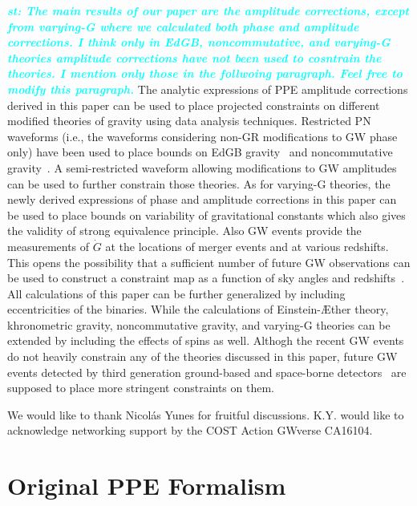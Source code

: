 \documentclass[prd,twocolumn,nofootinbib]{revtex4-1}
\newcommand{\st}[1]{\textcolor{cyan}{\it{\textbf{st: #1}}} }
\begin{document}
\st{The main results of our paper are the amplitude corrections, except from varying-G where we calculated both phase and amplitude corrections. I think only in EdGB, noncommutative, and varying-G theories amplitude corrections have not been used to cosntrain the theories. I mention only those in the follwoing paragraph. Feel free to modify this paragraph.}
The analytic expressions of PPE amplitude corrections derived in this paper can be used to place projected constraints on different modified theories of gravity using data analysis techniques. Restricted PN waveforms (i.e., the waveforms considering non-GR modifications to GW phase only) have been used to place bounds on EdGB gravity~\cite{Yunes:2016jcc} and noncommutative gravity~\cite{Kobakhidze:2016cqh}. A semi-restricted waveform allowing modifications to GW amplitudes can be used to further constrain those theories. As for varying-G theories, the newly derived expressions of phase and amplitude corrections in this paper can be used to place bounds on variability of gravitational constants which also gives the validity of strong equivalence principle. Also GW events provide the measurements of $\dot{G}$ at the locations of merger events and at various redshifts. This opens the possibility that a sufficient number of future GW observations can be used to construct a constraint map as a function of sky angles and redshifts~\cite{Yunes:2009bv}. All calculations of this paper can be further generalized by including eccentricities of the binaries. While the calculations of Einstein-\AE ther theory, khronometric gravity, noncommutative gravity, and varying-G theories can be extended by including the effects of spins as well. Althogh the recent GW events~\cite{Abbott:2016blz,Abbott:2016nmj,Abbott:2017vtc,Abbott:2017gyy,Abbott:2017oio,TheLIGOScientific:2017qsa} do not heavily constrain any of the theories discussed in this paper, future GW events detected by third generation ground-based and space-borne detectors~\cite{Hild:2010id,Seoane:2013qna,Yagi:2013du} are supposed to place more stringent constraints on them.


\label{sec:conclusions}

\acknowledgments
We would like to thank Nicol\' as Yunes for fruitful discussions.
K.Y. would like to acknowledge networking support by the COST Action GWverse CA16104.

 \appendix 
 
 \section{Original PPE Formalism}
 \label{appendix}
\end{document}
